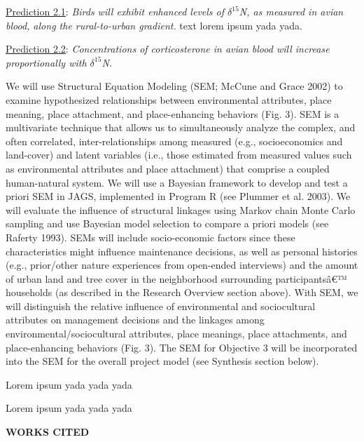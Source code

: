 \documentclass[12pt]{article}
\begin{document}

\noindent \underline{Prediction 2.1}: \textit{Birds will exhibit enhanced levels of $\delta^{15}$N, as measured in avian blood, along the rural-to-urban gradient.} 
text lorem ipsum yada yada. \par


\noindent \underline{Prediction 2.2}: \textit{Concentrations of corticosterone in avian blood will increase proportionally with $\delta^{15}$N.} \par \par

We will use Structural Equation Modeling (SEM; McCune and Grace 2002) to examine hypothesized relationships between environmental attributes, place meaning, place attachment, and place-enhancing behaviors (Fig. 3). SEM is a multivariate 
technique that allows us to simultaneously analyze the complex, and often correlated, inter-relationships among measured (e.g., socioeconomics and land-cover) and latent variables (i.e., those estimated from measured values such as 
environmental attributes and place attachment) that comprise a coupled human-natural system. We will use a Bayesian framework to develop and test a priori SEM in JAGS, implemented in Program R (see Plummer et al. 2003). We will evaluate 
the influence of structural linkages using Markov chain Monte Carlo sampling and use Bayesian model selection to compare a priori models (see Raferty 1993). SEMs will include socio-economic factors since these characteristics might 
influence maintenance decisions, as well as personal histories (e.g., prior/other nature experiences from open-ended interviews) and the amount of urban land and tree cover in the neighborhood surrounding participantsâ€™ households (as 
described in the Research Overview section above). With SEM, we will distinguish the relative influence of environmental and sociocultural attributes on management decisions and the linkages among environmental/sociocultural attributes, 
place meanings, place attachments, and place-enhancing behaviors (Fig. 3). The SEM for Objective 3 will be incorporated into the SEM for the overall project model (see Synthesis section below).


\par
Lorem ipsum yada yada yada


\par
Lorem ipsum yada yada yada

\noindent \begin{center} {\textbf {WORKS CITED}}\end{center} \par
\end{document}
